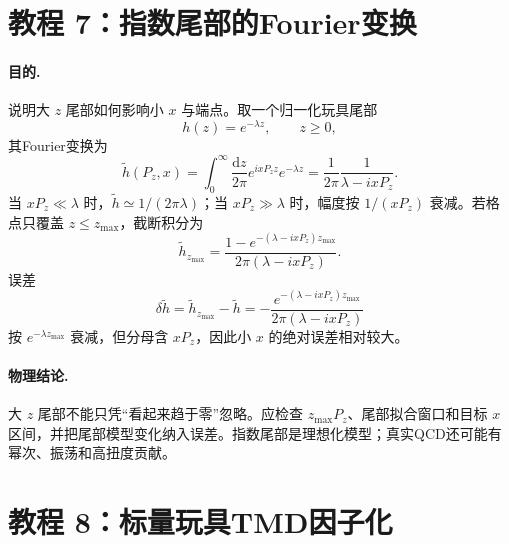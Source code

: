 \documentclass[UTF8,12pt,a4paper,twoside,openany]{ctexbook}
\newcommand{\dd}{\mathrm{d}}
\begin{document}
\section{教程 7：指数尾部的Fourier变换}

\paragraph{目的.} 说明大 \(z\) 尾部如何影响小 \(x\) 与端点。取一个归一化玩具尾部
\begin{equation}
  h(z)=e^{-\lambda z},
  \qquad z\ge0,
  \label{eq:tutorial-exp-tail}
\end{equation}
其Fourier变换为
\begin{equation}
  \widetilde h(P_z,x)
  =\int_0^\infty\frac{\dd z}{2\pi}
  e^{ixP_zz}e^{-\lambda z}
  =\frac{1}{2\pi}\frac{1}{\lambda-ixP_z}.
  \label{eq:tutorial-exp-fourier}
\end{equation}
当 \(xP_z\ll\lambda\) 时，\(\widetilde h\simeq1/(2\pi\lambda)\)；当 \(xP_z\gg\lambda\) 时，幅度按 \(1/(xP_z)\) 衰减。若格点只覆盖 \(z\le z_{\max}\)，截断积分为
\begin{equation}
  \widetilde h_{z_{\max}}
  =\frac{1-e^{-(\lambda-ixP_z)z_{\max}}}
  {2\pi(\lambda-ixP_z)}.
  \label{eq:tutorial-exp-truncated}
\end{equation}
误差
\begin{equation}
  \delta\widetilde h
  =\widetilde h_{z_{\max}}-\widetilde h
  =-\frac{e^{-(\lambda-ixP_z)z_{\max}}}
  {2\pi(\lambda-ixP_z)}
  \label{eq:tutorial-exp-error}
\end{equation}
按 \(e^{-\lambda z_{\max}}\) 衰减，但分母含 \(xP_z\)，因此小 \(x\) 的绝对误差相对较大。

\paragraph{物理结论.} 大 \(z\) 尾部不能只凭“看起来趋于零”忽略。应检查 \(z_{\max}P_z\)、尾部拟合窗口和目标 \(x\) 区间，并把尾部模型变化纳入误差。指数尾部是理想化模型；真实QCD还可能有幂次、振荡和高扭度贡献。

\section{教程 8：标量玩具TMD因子化}
\end{document}

